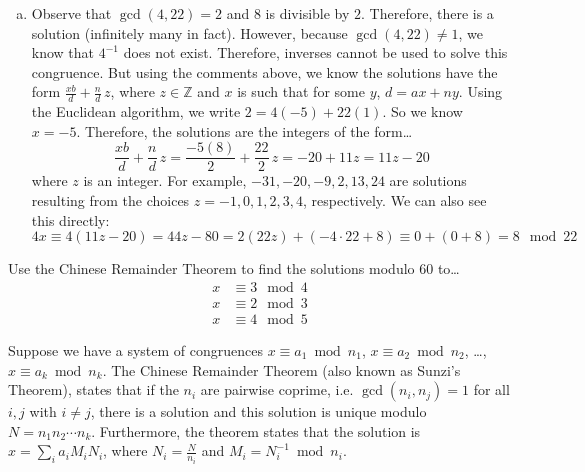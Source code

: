 \documentclass[11pt,letterpaper]{article}
\begin{document}
\begin{enumerate}[(a)]
\item Observe that $\gcd(4, 22)= 2$ and $8$ is divisible by $2$. Therefore, there is a solution (infinitely many in fact). However, because $\gcd(4, 22) \neq 1$, we know that $4^{-1}$ does not exist. Therefore, inverses cannot be used to solve this congruence. But using the comments above, we know the solutions have the form $\frac{xb}{d} + \frac{n}{d}\,z$, where $z \in \mathbb{Z}$ and $x$ is such that for some $y$, $d= ax + ny$. Using the Euclidean algorithm, we write $2= 4(-5) + 22(1)$. So we know $x= -5$. Therefore, the solutions are the integers of the form\dots
	\[
	\dfrac{xb}{d}+ \dfrac{n}{d} \, z = \dfrac{-5(8)}{2} + \dfrac{22}{2} \, z = -20 + 11z = 11z - 20
	\]
where $z$ is an integer. For example, $-31, -20, -9, 2, 13, 24$ are solutions resulting from the choices $z= -1, 0, 1, 2, 3, 4$, respectively. We can also see this directly:
	\[
	4x \equiv 4(11z - 20)= 44z - 80= 2(22z) + (-4 \cdot 22 + 8) \equiv 0 + (0 + 8) = 8 \mod 22
	\]
\end{enumerate}



\newpage



 Use the Chinese Remainder Theorem to find the solutions modulo 60 to\dots
	\[
	\begin{aligned}
	x &\equiv 3 \mod 4 \\
	x&\equiv 2 \mod 3 \\
	x&\equiv 4 \mod 5
	\end{aligned}
	\] \pspace

\sol Suppose we have a system of congruences $x \equiv a_1 \bmod n_1$, $x \equiv a_2 \bmod n_2$, \dots, $x \equiv a_k \bmod n_k$. The Chinese Remainder Theorem (also known as Sunzi's Theorem), states that if the $n_i$ are pairwise coprime, i.e. $\gcd(n_i, n_j)= 1$ for all $i, j$ with $i \neq j$, there is a solution and this solution is unique modulo $N= n_1n_2 \cdots n_k$. Furthermore, the theorem states that the solution is $x= \sum_i a_i M_i N_i$, where $N_i= \frac{N}{n_i}$ and $M_i= N_i^{-1} \bmod n_i$. \pspace
\end{document}
